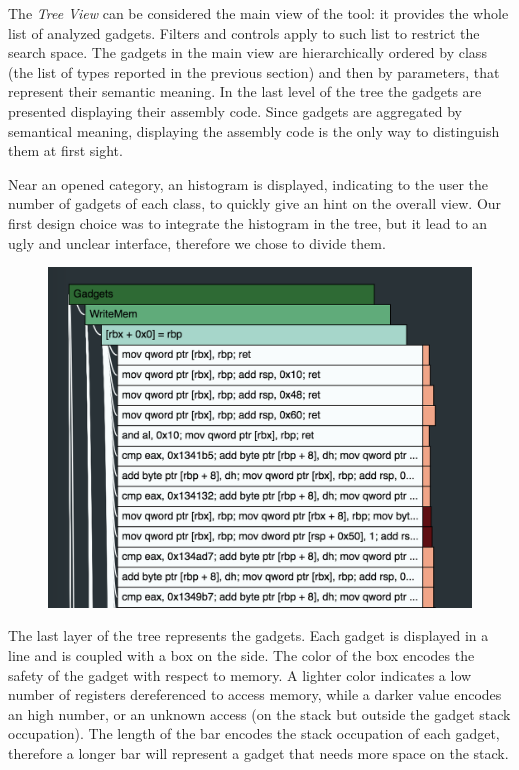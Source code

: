 \documentclass[twocolumn, 11pt]{article}
\begin{document}
The \textit{Tree View} can be considered the main view of the tool: it provides the whole list of analyzed gadgets. Filters and controls apply to such list to restrict the search space. The gadgets in the main view are hierarchically ordered by class (the list of types reported in the previous section) and then by parameters, that represent their semantic meaning. In the last level of the tree the gadgets are presented displaying their assembly code. Since gadgets are aggregated by semantical meaning, displaying the assembly code is the only way to distinguish them at first sight.

Near an opened category, an histogram is displayed, indicating to the user the number of gadgets of each class, to quickly give an hint on the overall view. Our first design choice was to integrate the histogram in the tree, but it lead to an ugly and unclear interface, therefore we chose to divide them.

\begin{figure}[htb]
  \centering
  \includegraphics[width=0.8\linewidth]{tree-view_2}
\end{figure}

The last layer of the tree represents the gadgets. Each gadget is displayed in a line and is coupled with a box on the side. The color of the box encodes the safety of the gadget with respect to memory. A lighter color indicates a low number of registers dereferenced to access memory, while a darker value encodes an high number, or an unknown access (on the stack but outside the gadget stack occupation). The length of the bar encodes the stack occupation of each gadget, therefore a longer bar will represent a gadget that needs more space on the stack.
\end{document}
